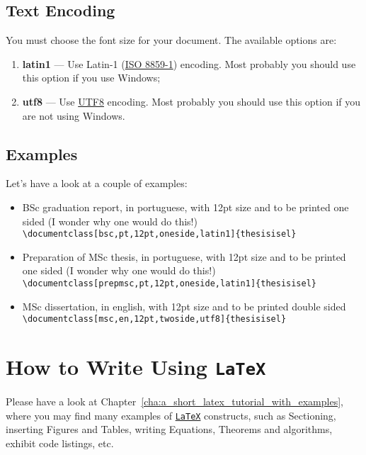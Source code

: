 \subsection{Text Encoding} %
\label{ssec:text_encoding}

You must choose the font size for your document. The available options are:
\begin{enumerate}
	\item \textbf{latin1} --- Use Latin-1 (\href{http://en.wikipedia.org/wiki/ISO/IEC_8859-1}{ISO 8859-1}) encoding.  Most probably you should use this option if you use Windows;
	\item \textbf{utf8} --- Use \href{http://en.wikipedia.org/wiki/UTF-8}{UTF8} encoding.    Most probably you should use this option if you are not using Windows.
\end{enumerate}

\subsection{Examples} %
\label{ssec:examples}

Let's have a look at a couple of examples:

\begin{itemize}
	\item BSc graduation report, in portuguese, with 12pt size and to be printed one sided (I wonder why one would do this!)\\
	\verb!\documentclass[bsc,pt,12pt,oneside,latin1]{thesisisel}!
	\item Preparation of MSc thesis, in portuguese, with 12pt size and to be printed one sided (I wonder why one would do this!)\\
	\verb!\documentclass[prepmsc,pt,12pt,oneside,latin1]{thesisisel}!
	\item MSc dissertation, in english, with 12pt size and to be printed double sided\\
	\verb!\documentclass[msc,en,12pt,twoside,utf8]{thesisisel}!
\end{itemize}

\section{How to Write Using \texttt{LaTeX}} %
\label{sec:how_to_write_using_latex}

Please have a look at Chapter~\ref{cha:a_short_latex_tutorial_with_examples}, where you may find many examples of \href{http://tobi.oetiker.ch/lshort/lshort.pdf}{\texttt{LaTeX}} constructs, such as Sectioning, inserting Figures and Tables, writing Equations, Theorems and algorithms, exhibit code listings, etc.

